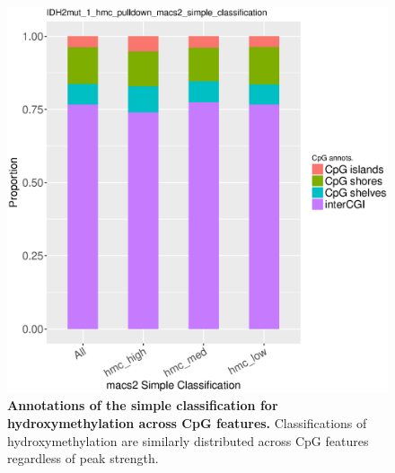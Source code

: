 \begin{figure}[ht!]
\centering
\includegraphics[width=1\textwidth]{chap5figs/figure5_7.eps}
\caption[Annotations of the simple classification across CpG features.]
{
\textbf{Annotations of the simple classification for hydroxymethylation across CpG features.} Classifications of hydroxymethylation are similarly distributed across CpG features regardless of peak strength.
}
\label{chap5:fig:7}
\end{figure}

\newpage

